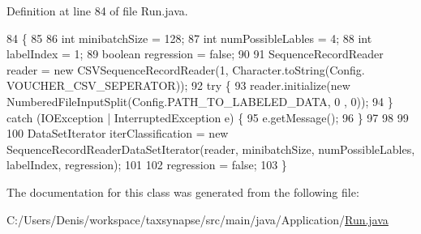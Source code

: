 Definition at line 84 of file Run.\+java.


\begin{DoxyCode}
84                                    \{
85         
86         \textcolor{keywordtype}{int} minibatchSize = 128;
87         \textcolor{keywordtype}{int} numPossibleLables = 4;
88         \textcolor{keywordtype}{int} labelIndex = 1;
89         \textcolor{keywordtype}{boolean} regression = \textcolor{keyword}{false};
90         
91         SequenceRecordReader reader = \textcolor{keyword}{new} CSVSequenceRecordReader(1, Character.toString(Config.
      VOUCHER\_CSV\_SEPERATOR));
92         \textcolor{keywordflow}{try} \{
93             reader.initialize(\textcolor{keyword}{new} NumberedFileInputSplit(Config.PATH\_TO\_LABELED\_DATA, 0 , 0));
94         \} \textcolor{keywordflow}{catch} (IOException | InterruptedException e) \{
95             e.getMessage();
96         \}
97         
98         
99         
100         DataSetIterator iterClassification = \textcolor{keyword}{new} SequenceRecordReaderDataSetIterator(reader, minibatchSize,
       numPossibleLables, labelIndex, regression);
101         
102         regression = \textcolor{keyword}{false};
103     \}
\end{DoxyCode}


The documentation for this class was generated from the following file\+:\begin{DoxyCompactItemize}
\item 
C\+:/\+Users/\+Denis/workspace/taxsynapse/src/main/java/\+Application/\hyperlink{_run_8java}{Run.\+java}\end{DoxyCompactItemize}

